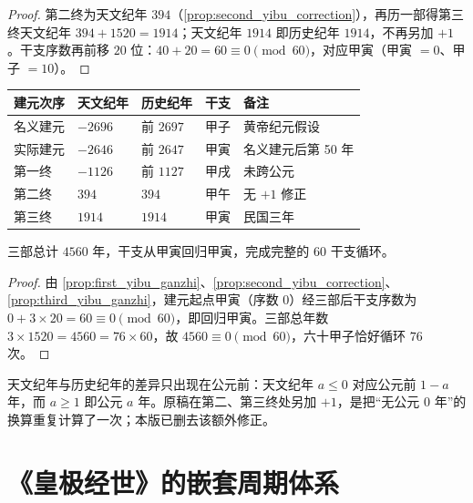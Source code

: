 \begin{proof}
第二终为天文纪年 \(394\)（\cref{prop:second_yibu_correction}），再历一部得第三终天文纪年 \(394+1520=1914\)；天文纪年 \(1914\) 即历史纪年 \(1914\)，不再另加 \(+1\)。干支序数再前移 \(20\) 位：\(40+20=60\equiv 0\pmod{60}\)，对应甲寅（甲寅 \(=0\)、甲子 \(=10\)）。
\end{proof}

\begin{theorem}[轩辕历法建元序列的完整性]\label{thm:xuanyuan_complete_sequence}
\begin{center}
\begin{tabular}{>{\centering\arraybackslash}p{2.5cm}>{\centering\arraybackslash}p{2.5cm}>{\centering\arraybackslash}p{2.5cm}>{\centering\arraybackslash}p{2.5cm}>{\centering\arraybackslash}p{3cm}}
\toprule
建元次序 & 天文纪年 & 历史纪年 & 干支 & 备注 \\
\midrule
名义建元 & \(-2696\) & 前 \(2697\) & 甲子 & 黄帝纪元假设 \\
实际建元 & \(-2646\) & 前 \(2647\) & 甲寅 & 名义建元后第 50 年 \\
第一终 & \(-1126\) & 前 \(1127\) & 甲戌 & 未跨公元 \\
第二终 & \(394\) & \(394\) & 甲午 & 无 \(+1\) 修正 \\
第三终 & \(1914\) & \(1914\) & 甲寅 & 民国三年 \\
\bottomrule
\end{tabular}
\end{center}
三部总计 \(4560\) 年，干支从甲寅回归甲寅，完成完整的 \(60\) 干支循环。
\end{theorem}

\begin{proof}
由 \cref{prop:first_yibu_ganzhi}、\cref{prop:second_yibu_correction}、\cref{prop:third_yibu_ganzhi}，建元起点甲寅（序数 \(0\)）经三部后干支序数为 \(0+3\times 20=60\equiv 0\pmod{60}\)，即回归甲寅。三部总年数 \(3\times 1520=4560=76\times 60\)，故 \(4560\equiv 0\pmod{60}\)，六十甲子恰好循环 \(76\) 次。
\end{proof}

\begin{remark}[天文纪年与历史纪年的差异]\label{rem:calendar_year_difference}
天文纪年与历史纪年的差异只出现在公元前：天文纪年 \(a\le 0\) 对应公元前 \(1-a\) 年，而 \(a\ge 1\) 即公元 \(a\) 年。原稿在第二、第三终处另加 \(+1\)，是把“无公元 \(0\) 年”的换算重复计算了一次；本版已删去该额外修正。
\end{remark}

\section{《皇极经世》的嵌套周期体系}
\label{sec:huangji_jingshi}

